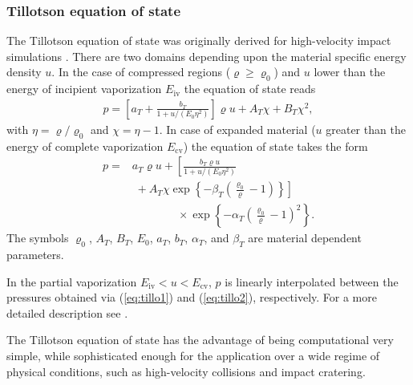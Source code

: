 \documentclass[10pt,fleqn,twoside]{article}
\begin{document}
\subsubsection{Tillotson equation of state}
\label{section:tillotson}
The Tillotson equation of state was originally derived for high-velocity impact simulations \citep{til62}.
There are two domains depending upon the material specific energy density $u$. In the case of compressed regions ($\varrho \geq
 \varrho_0$) and $u$ lower than the energy of incipient vaporization $E_\mathrm{iv}$ the equation of state reads
%
\begin{align}\label{eq:tillo1}
 p = \left[ a_T + \frac{b_T}{1+u/(E_0 \eta^2)} \right]\varrho u + A_T\chi + B_T\chi^2,
\end{align}
%
with $\eta = \varrho / \varrho_0$ and $\chi = \eta-1$.
In case of expanded material ($u$ greater than the energy of complete vaporization $E_\mathrm{cv}$) the
equation of state takes the form
%
\begin{align}\label{eq:tillo2}
 p = & a_T\varrho u +  \left[ \frac{b_T\varrho u}{1+u/(E_0 \eta^2)} \right. \nonumber                              \\
     & \; + \left. A_T\chi \exp \left\{-\beta_T \left(\frac{\varrho_0}{\varrho}-1\right)\right\} \right] \nonumber \\ & \qquad \qquad
 \times  \exp
 \left\{-\alpha_T\left(\frac{\varrho_0}{\varrho}-1\right)^2\right\}.
\end{align}
%
The symbols $\varrho_0$, $A_T$, $B_T$, $E_0$, $a_T$, $b_T$, $\alpha_T$, and $\beta_T$ are material dependent
parameters.

In the partial vaporization $E_\mathrm{iv} < u < E_\mathrm{cv}$, $p$ is linearly interpolated between the pressures
obtained via (\ref{eq:tillo1}) and (\ref{eq:tillo2}), respectively. For a more detailed description see
\cite{melosh1996impact}.

The Tillotson equation of state has the advantage of being computational very simple, while sophisticated enough for the
application over a wide regime of physical conditions, such as high-velocity collisions and impact cratering.
\end{document}

